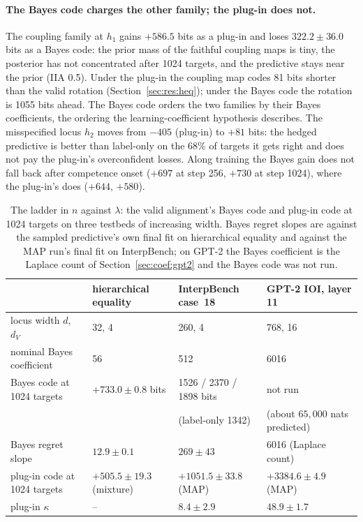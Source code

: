 \documentclass[11pt,a4paper]{article}
\newcommand{\dv}{d_V}
\begin{document}
\paragraph{The Bayes code charges the other family; the plug-in does not.} The coupling family at $h_1$ gains $+586.5$ bits as a plug-in and loses $322.2\pm36.0$ bits as a Bayes code: the prior mass of the faithful coupling maps is tiny, the posterior has not concentrated after 1024 targets, and the predictive stays near the prior (IIA 0.5). Under the plug-in the coupling map codes 81 bits shorter than the valid rotation (Section~\ref{sec:res:heq}); under the Bayes code the rotation is 1055 bits ahead. The Bayes code orders the two families by their Bayes coefficients, the ordering the learning-coefficient hypothesis describes. The misspecified locus $h_2$ moves from $-405$ (plug-in) to $+81$ bits: the hedged predictive is better than label-only on the 68\% of targets it gets right and does not pay the plug-in's overconfident losses. Along training the Bayes gain does not fall back after competence onset ($+697$ at step 256, $+730$ at step 1024), where the plug-in's does ($+644$, $+580$).

\begin{table}[t]
\centering
\footnotesize
\caption{The ladder in $n$ against $\lambda$: the valid alignment's Bayes code and plug-in code at 1024 targets on three testbeds of increasing width. Bayes regret slopes are against the sampled predictive's own final fit on hierarchical equality and against the MAP run's final fit on InterpBench; on GPT-2 the Bayes coefficient is the Laplace count of Section~\ref{sec:coef:gpt2} and the Bayes code was not run.}
\label{tab:ladder}
\setlength{\tabcolsep}{4pt}
\begin{tabular}{llll}
\toprule
 & hierarchical equality & InterpBench case~18 & GPT-2 IOI, layer 11\\
\midrule
locus width $d$, $\dv$ & 32, 4 & 260, 4 & 768, 16\\
nominal Bayes coefficient & 56 & 512 & 6016\\
Bayes code at 1024 targets & $+733.0\pm0.8$ bits & 1526 / 2370 / 1898 bits & not run\\
 & & (label-only 1342) & (about $65{,}000$ nats predicted)\\
Bayes regret slope & $12.9\pm0.1$ & $269\pm43$ & 6016 (Laplace count)\\
plug-in code at 1024 targets & $+505.5\pm19.3$ (mixture) & $+1051.5\pm33.8$ (MAP) & $+3384.6\pm4.9$ (MAP)\\
plug-in $\kappa$ & -- & $8.4\pm2.9$ & $48.9\pm1.7$\\
\bottomrule
\end{tabular}
\end{table}
\end{document}
